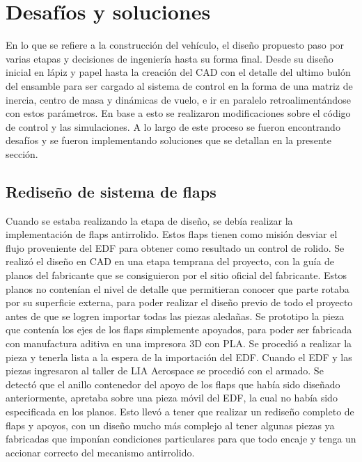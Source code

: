\section{Desafíos y soluciones}\label{sec:challenges-solutions}

En lo que se refiere a la construcción del vehículo, el diseño propuesto paso por varias etapas y
decisiones de ingeniería hasta su forma final. Desde su diseño inicial en lápiz y papel hasta la
creación del CAD con el detalle del ultimo bulón del ensamble para ser cargado al sistema de control en la forma de una matriz de inercia, centro de masa y dinámicas de vuelo, e ir en paralelo retroalimentándose con estos parámetros. En base a esto se realizaron modificaciones sobre el código de control y las simulaciones. A lo largo de este proceso se fueron encontrando desafíos y se fueron implementando soluciones que se detallan en la presente sección.


\subsection{Rediseño de sistema de flaps}

Cuando se estaba realizando la etapa de diseño, se debía realizar la implementación de flaps antirrolido. Estos flaps tienen como misión desviar el flujo proveniente del EDF para obtener como resultado un control de rolido. Se realizó el diseño en CAD en una etapa temprana del proyecto, con la guía de planos del fabricante que se consiguieron por el sitio oficial del fabricante. Estos planos no contenían el nivel de detalle que permitieran conocer que parte rotaba por su superficie externa, para poder realizar el diseño previo de todo el proyecto antes de que se logren importar todas las piezas aledañas. Se prototipo la pieza que contenía los ejes de los flaps simplemente apoyados, para poder ser fabricada con manufactura aditiva en una impresora 3D con PLA. Se procedió a realizar la pieza y tenerla lista a la espera de la importación del EDF. Cuando el EDF y las piezas ingresaron al taller de LIA Aerospace se procedió con el armado. Se detectó que el anillo contenedor del apoyo de los flaps que había sido diseñado anteriormente, apretaba sobre una pieza móvil del EDF, la cual no había sido especificada en los planos. Esto llevó a tener que realizar un rediseño completo de flaps y apoyos, con un diseño mucho más complejo al tener algunas piezas ya fabricadas que imponían condiciones particulares para que todo encaje y tenga un accionar correcto del mecanismo antirrolido.

